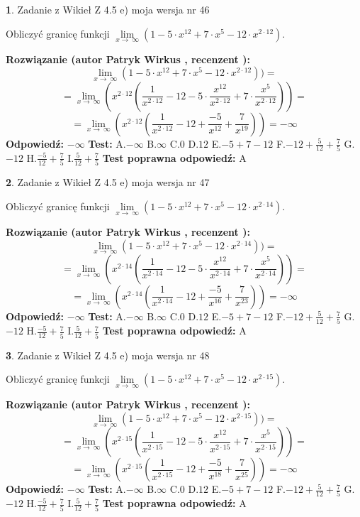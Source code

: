 \documentclass[12pt, a4paper]{article}
\theoremstyle{definition} %
\newtheorem{zad}{}
\newcommand{\zadStart}[1]{\begin{zad}#1\newline}
\newcommand{\zadStop}{\end{zad}}
\newcommand{\rozwStart}[2]{\noindent \textbf{Rozwiązanie (autor #1 , recenzent #2): }\newline}
\newcommand{\rozwStop}{\newline}
\newcommand{\odpStart}{\noindent \textbf{Odpowiedź:}\newline}
\newcommand{\odpStop}{\newline}
\newcommand{\testStart}{\noindent \textbf{Test:}\newline}
\newcommand{\testStop}{\newline}
\newcommand{\kluczStart}{\noindent \textbf{Test poprawna odpowiedź:}\newline}
\newcommand{\kluczStop}{\newline}
\begin{document}
\zadStart{Zadanie z Wikieł Z 4.5 e) moja wersja nr 46}



Obliczyć granicę funkcji  $\lim\limits_{x\to\ \infty}(1 - 5 \cdot x^{12}+7 \cdot x^{5}- 12 \cdot x^{2\cdot12})$.
\zadStop
\rozwStart{Patryk Wirkus}{}
$$\lim\limits_{x\to\ \infty}(1 - 5 \cdot x^{12}+7 \cdot x^{5}- 12 \cdot x^{2\cdot12}))=$$
$$=\lim\limits_{x\to\ \infty}(x^{2\cdot12}(\frac{1}{x^{2\cdot12}}-12 -5 \cdot \frac{x^{12}}{x^{2\cdot12}}+7 \cdot \frac{x^{5}}{x^{2\cdot12}}))=$$
$$=\lim\limits_{x\to\ \infty}(x^{2\cdot12}(\frac{1}{x^{2\cdot12}}-12 + \frac{-5}{x^{12}}+ \frac{7}{x^{19}}))=-\infty$$
\rozwStop
\odpStart
$-\infty$
\odpStop
\testStart
A.$-\infty$ B.$\infty$ C.$0$ D.$12$ E.$-5 + 7 - 12$
F.$-12+\frac{5}{12}+\frac{7}{5}$ G.$-12$
H.$\frac{-5}{12}+\frac{7}{5}$
I.$\frac{5}{12}+\frac{7}{5}$
\testStop
\kluczStart
A
\kluczStop



\zadStart{Zadanie z Wikieł Z 4.5 e) moja wersja nr 47}



Obliczyć granicę funkcji  $\lim\limits_{x\to\ \infty}(1 - 5 \cdot x^{12}+7 \cdot x^{5}- 12 \cdot x^{2\cdot14})$.
\zadStop
\rozwStart{Patryk Wirkus}{}
$$\lim\limits_{x\to\ \infty}(1 - 5 \cdot x^{12}+7 \cdot x^{5}- 12 \cdot x^{2\cdot14}))=$$
$$=\lim\limits_{x\to\ \infty}(x^{2\cdot14}(\frac{1}{x^{2\cdot14}}-12 -5 \cdot \frac{x^{12}}{x^{2\cdot14}}+7 \cdot \frac{x^{5}}{x^{2\cdot14}}))=$$
$$=\lim\limits_{x\to\ \infty}(x^{2\cdot14}(\frac{1}{x^{2\cdot14}}-12 + \frac{-5}{x^{16}}+ \frac{7}{x^{23}}))=-\infty$$
\rozwStop
\odpStart
$-\infty$
\odpStop
\testStart
A.$-\infty$ B.$\infty$ C.$0$ D.$12$ E.$-5 + 7 - 12$
F.$-12+\frac{5}{12}+\frac{7}{5}$ G.$-12$
H.$\frac{-5}{12}+\frac{7}{5}$
I.$\frac{5}{12}+\frac{7}{5}$
\testStop
\kluczStart
A
\kluczStop



\zadStart{Zadanie z Wikieł Z 4.5 e) moja wersja nr 48}



Obliczyć granicę funkcji  $\lim\limits_{x\to\ \infty}(1 - 5 \cdot x^{12}+7 \cdot x^{5}- 12 \cdot x^{2\cdot15})$.
\zadStop
\rozwStart{Patryk Wirkus}{}
$$\lim\limits_{x\to\ \infty}(1 - 5 \cdot x^{12}+7 \cdot x^{5}- 12 \cdot x^{2\cdot15}))=$$
$$=\lim\limits_{x\to\ \infty}(x^{2\cdot15}(\frac{1}{x^{2\cdot15}}-12 -5 \cdot \frac{x^{12}}{x^{2\cdot15}}+7 \cdot \frac{x^{5}}{x^{2\cdot15}}))=$$
$$=\lim\limits_{x\to\ \infty}(x^{2\cdot15}(\frac{1}{x^{2\cdot15}}-12 + \frac{-5}{x^{18}}+ \frac{7}{x^{25}}))=-\infty$$
\rozwStop
\odpStart
$-\infty$
\odpStop
\testStart
A.$-\infty$ B.$\infty$ C.$0$ D.$12$ E.$-5 + 7 - 12$
F.$-12+\frac{5}{12}+\frac{7}{5}$ G.$-12$
H.$\frac{-5}{12}+\frac{7}{5}$
I.$\frac{5}{12}+\frac{7}{5}$
\testStop
\kluczStart
A
\kluczStop
\end{document}
